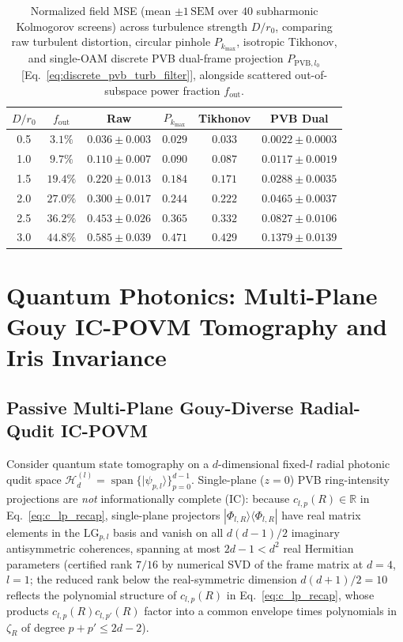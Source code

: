 \documentclass[aps,pra,onecolumn,notitlepage,11pt,tightenlines,nofootinbib,floatfix,longbibliography]{revtex4-2}
\newcommand{\ket}[1]{| #1 \rangle}
\newcommand{\bra}[1]{\langle #1 |}
\begin{document}
\begin{table}[t]
\caption{Normalized field MSE (mean $\pm 1\,\mathrm{SEM}$ over $40$ subharmonic Kolmogorov screens) across turbulence strength $D/r_0$, comparing raw turbulent distortion, circular pinhole $P_{k_{\max}}$, isotropic Tikhonov, and single-OAM discrete PVB dual-frame projection $P_{\mathrm{PVB},l_0}$ [Eq.~\eqref{eq:discrete_pvb_turb_filter}], alongside scattered out-of-subspace power fraction $f_{\mathrm{out}}$.}
\label{tab:kolmogorov}
\begin{ruledtabular}
\footnotesize
\setlength{\tabcolsep}{1.8pt}
\begin{tabular}{cccccc}
$D/r_0$ & $f_{\mathrm{out}}$ & Raw & $P_{k_{\max}}$ & Tikhonov & PVB Dual \\
\hline
0.5 & $3.1\%$ & $0.036\pm 0.003$ & $0.029$ & $0.033$ & $0.0022\pm 0.0003$ \\
1.0 & $9.7\%$ & $0.110\pm 0.007$ & $0.090$ & $0.087$ & $0.0117\pm 0.0019$ \\
1.5 & $19.4\%$ & $0.220\pm 0.013$ & $0.184$ & $0.171$ & $0.0288\pm 0.0035$ \\
2.0 & $27.0\%$ & $0.300\pm 0.017$ & $0.244$ & $0.222$ & $0.0465\pm 0.0037$ \\
2.5 & $36.2\%$ & $0.453\pm 0.026$ & $0.365$ & $0.332$ & $0.0827\pm 0.0106$ \\
3.0 & $44.8\%$ & $0.585\pm 0.039$ & $0.471$ & $0.429$ & $0.1379\pm 0.0139$ \\
\end{tabular}
\end{ruledtabular}
\end{table}

\section{Quantum Photonics: Multi-Plane Gouy IC-POVM Tomography and Iris Invariance}
\label{sec:quantum}

\subsection{Passive Multi-Plane Gouy-Diverse Radial-Qudit IC-POVM}
\label{subsec:povm}

Consider quantum state tomography on a $d$-dimensional fixed-$l$ radial photonic qudit space $\mathcal{H}_d^{(l)} = \operatorname{span}\{\ket{\psi_{p,l}}\}_{p=0}^{d-1}$. Single-plane ($z = 0$) PVB ring-intensity projections are \emph{not} informationally complete (IC): because $c_{l,p}(R) \in \mathbb{R}$ in Eq.~\eqref{eq:c_lp_recap}, single-plane projectors $\ket{\Phi_{l,R}}\bra{\Phi_{l,R}}$ have real matrix elements in the $\mathrm{LG}_{p,l}$ basis and vanish on all $d(d-1)/2$ imaginary antisymmetric coherences, spanning at most $2d - 1 < d^2$ real Hermitian parameters (certified rank $7/16$ by numerical SVD of the frame matrix at $d = 4$, $l = 1$; the reduced rank below the real-symmetric dimension $d(d+1)/2 = 10$ reflects the polynomial structure of $c_{l,p}(R)$ in Eq.~\eqref{eq:c_lp_recap}, whose products $c_{l,p}(R)c_{l,p'}(R)$ factor into a common envelope times polynomials in $\zeta_R$ of degree $p + p' \le 2d - 2$).
\end{document}
